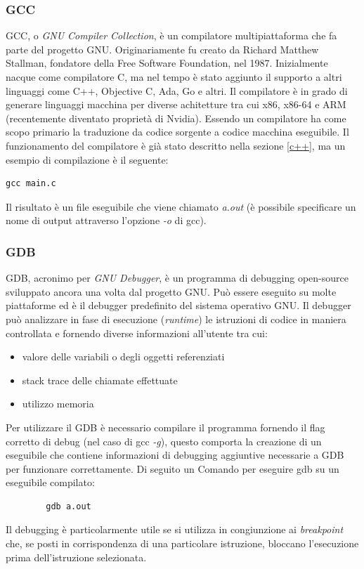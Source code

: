         \newpage\subsubsection{GCC}
        GCC, o \textit{GNU Compiler Collection}, è un compilatore multipiattaforma che fa parte del
        progetto GNU. Originariamente fu creato da Richard Matthew Stallman, fondatore della Free Software
        Foundation, nel 1987. Inizialmente nacque come compilatore C, ma nel tempo è stato aggiunto il supporto a altri
        linguaggi come C++, Objective C, Ada, Go e altri. Il compilatore è in grado di generare linguaggi macchina per
        diverse achitetture tra cui x86, x86-64 e ARM (recentemente diventato proprietà di Nvidia).
        Essendo un compilatore ha come scopo primario la traduzione da codice sorgente a
        codice macchina eseguibile. Il funzionamento del compilatore è già stato descritto nella sezione
        \ref*{c++}, ma un esempio di compilazione è il seguente:
        \begin{verbatim}
gcc main.c
        \end{verbatim}
        Il risultato è un file eseguibile che viene chiamato \textit{a.out}
        (è possibile specificare un nome di output attraverso l'opzione \textit{-o} di gcc).

        \subsubsection{GDB}
        GDB, acronimo per \textit{GNU Debugger}, è un programma di debugging open-source sviluppato
        ancora una volta dal progetto GNU. Può essere eseguito su molte piattaforme ed è il debugger
        predefinito del sistema operativo GNU. Il debugger può analizzare in fase di esecuzione (\textit{runtime})
        le istruzioni di codice in maniera controllata e fornendo diverse informazioni all'utente tra cui:
        \begin{itemize}
            \item valore delle variabili o degli oggetti referenziati
            \item stack trace delle chiamate effettuate
            \item utilizzo memoria
        \end{itemize}
        Per utilizzare il GDB è necessario compilare il programma fornendo il flag corretto di debug
        (nel caso di gcc \textit{-g}), questo comporta la creazione di un eseguibile che contiene
        informazioni di debugging aggiuntive necessarie a GDB per funzionare correttamente.
        Di seguito un Comando per eseguire gdb su un eseguibile compilato:
        \begin{verbatim}
        gdb a.out
        \end{verbatim}
        Il debugging è particolarmente utile se si utilizza in congiunzione ai \textit{breakpoint}
        che, se posti in corrispondenza di una particolare istruzione, bloccano l'esecuzione prima
        dell'istruzione selezionata.

